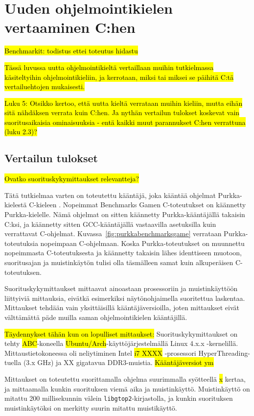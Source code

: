 \section{Uuden ohjelmointikielen vertaaminen C:hen}

\hl{Benchmarkit: todistus ettei toteutus hidastu}

\hl{Tässä luvussa uutta ohjelmointikieltä vertaillaan muihin tutkielmassa
käsiteltyihin ohjelmointikieliin, ja kerrotaan, miksi tai miksei se päihitä
C:tä vertailuehtojen mukaisesti.}

\hl{ Luku 5: Otsikko kertoo, että uutta kieltä verrataan muihin kieliin, mutta
eihän sitä nähdäksen verrata kuin C:hen. Ja nythän vertailun tulokset koskevat
vain suoritusaikaisia ominaisuuksia - entä kaikki muut parannukset C:hen
verrattuna (luku 2.3)? }

\subsection{Vertailun tulokset}
\label{sec:results}

\hl{Ovatko suorituskykymittaukset relevantteja?}

Tätä tutkielmaa varten on toteutettu kääntäjä, joka kääntää ohjelmat
Purkka-kielestä C-kieleen \citep{purkka}. Nopeimmat Benchmarks Gamen
C-toteutukset on käännetty Purkka-kielelle. Nämä ohjelmat on sitten käännetty
Purkka-kääntäjällä takaisin C:ksi, ja käännetty sitten GCC-kääntäjällä
vastaavilla asetuksilla kuin verrattavat C-ohjelmat.
Kuvassa~\ref{fig:purkkabenchmarksgame} verrataan Purkka-toteutuksia nopeimpaan
C-ohjelmaan. Koska Purkka-toteutukset on muunnettu nopeimmasta C-toteutuksesta
ja käännetty takaisin lähes identtiseen muotoon, suoritusajan ja muistinkäytön
tulisi olla täsmälleen samat kuin alkuperäisen C-toteutuksen.

Suorituskykymittaukset mittaavat ainoastaan prosessoriin ja muistinkäyttöön
liittyiviä mittauksia, eivätkä esimerkiksi näytönohjaimella suoritettua
laskentaa. Mittaukset tehdään vain yksittäisillä kääntäjäversioilla, joten
mittaukset eivät välttämättä päde muilla saman ohjelmointikielen kääntäjillä.

\hl{Täydennykset tähän kun on lopulliset mittaukset: } Suorituskykymittaukset
on tehty \hl{ABC}-koneella \hl{Ubuntu/Arch}-käyttöjärjestelmällä Linux 4.x.x
-kernelillä. Mittaustietokoneessa oli neliytiminen Intel \hl{i7 XXXX}
-prosessori HyperThreading-tuella (3.x GHz) ja XX gigatavua DDR3-muistia.
\hl{Kääntäjäversiot ym}

Mittaukset on toteutettu suorittamalla ohjelma suurimmalla syötteellä \hl{x}
kertaa, ja mittaamalla kunkin suorituksen viemä aika ja muistinkäyttö.
Muistinkäyttö on mitattu 200 millisekunnin välein
\texttt{libgtop2}-kirjastolla, ja kunkin suorituksen muistinkäytöksi on
merkitty suurin mitattu muistikäyttö.

